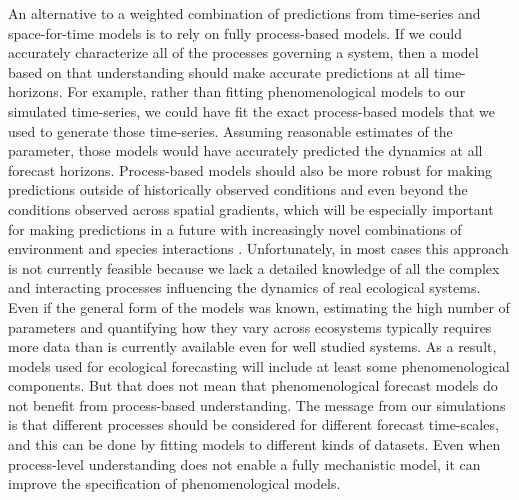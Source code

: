 \documentclass[11pt]{article}
\begin{document}
An alternative to a weighted combination of predictions from time-series and space-for-time models is to rely on fully process-based models. If we could accurately characterize all of the processes governing a system, then a model based on that understanding should make accurate predictions at all time-horizons. For example, rather than fitting phenomenological models to our simulated time-series, we could have fit the exact process-based models that we used to generate those time-series. Assuming reasonable estimates of the parameter, those models would have accurately predicted the dynamics at all forecast horizons. Process-based models should also be more robust for making predictions outside of historically observed conditions and even beyond the conditions observed across spatial gradients, which will be especially important for making predictions in a future with increasingly novel combinations of environment and species interactions \citep{Williams2007}. Unfortunately, in most cases this approach is not currently feasible because we lack a detailed knowledge of all the complex and interacting processes influencing the dynamics of real ecological systems. Even if the general form of the models was known, estimating the high number of parameters and quantifying how they vary across ecosystems typically requires more data than is currently available even for well studied systems. 
As a result, models used for ecological forecasting will include at least some phenomenological components. But that does not mean that phenomenological forecast models do not benefit from process-based understanding. The message from our simulations is that different processes should be considered for different forecast time-scales, and this can be done by fitting models to different kinds of datasets. Even when process-level understanding does not enable a fully mechanistic model, it can improve the specification of phenomenological models.
\end{document}
